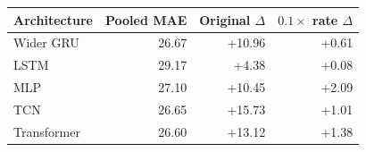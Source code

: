 \begin{tabular}{lrrr}\toprule
Architecture & Pooled MAE & Original $\Delta$ & $0.1\times$ rate $\Delta$ \\\midrule
Wider GRU & 26.67 & +10.96 & +0.61 \\
LSTM & 29.17 & +4.38 & +0.08 \\
MLP & 27.10 & +10.45 & +2.09 \\
TCN & 26.65 & +15.73 & +1.01 \\
Transformer & 26.60 & +13.12 & +1.38 \\
\bottomrule
\end{tabular}
